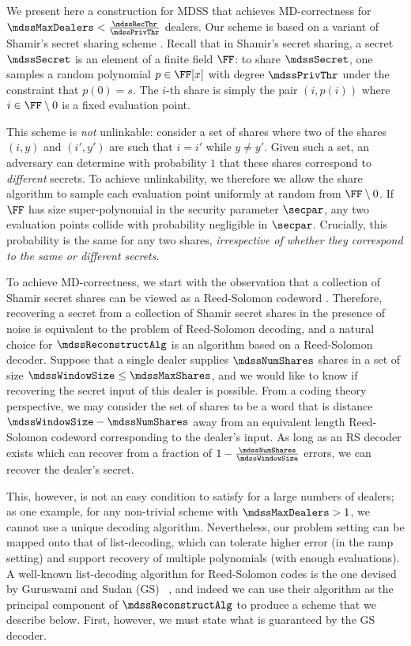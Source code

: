 We present here a construction for MDSS that achieves MD-correctness for $\mdssMaxDealers < \frac{\mdssRecThr}{\mdssPrivThr}$ dealers.
Our scheme is based on a variant of Shamir's secret sharing scheme \cite{Shamir79}.
Recall that in Shamir's secret sharing, a secret $\mdssSecret$ is an element of a finite field $\FF$: to share $\mdssSecret$, one samples a random polynomial $p \in \FF[x]$ with degree $\mdssPrivThr$ under the constraint that $p(0) = s$.
The $i$-th share is simply the pair $(i, p(i))$ where $i \in \FF \setminus 0$ is a fixed evaluation point.

This scheme is {\em not} unlinkable: consider a set of shares where two of the shares $(i,y)$ and $(i',y')$ are such that $i=i'$ while  $y\neq y'$.
Given such a set, an adversary can determine with probability $1$ that these shares correspond to {\em different} secrets.
To achieve unlinkability, we therefore we allow the share algorithm to sample each evaluation point uniformly at random from $\FF \setminus 0$.
If $\FF$ has size super-polynomial in the security parameter $\secpar$, any two evaluation points collide with probability negligible in $\secpar$.
Crucially, this probability is the same for any two shares, {\em irrespective of whether they correspond to the same or different secrets}.

To achieve MD-correctness, we start with the observation that a collection of Shamir secret shares can be viewed as a Reed-Solomon codeword \cite{localReeSol60, localMcEliece81}.
Therefore, recovering a secret from a collection of Shamir secret shares in the presence of noise is equivalent to the problem of Reed-Solomon decoding, and a natural choice for $\mdssReconstructAlg$ is an algorithm based on a Reed-Solomon decoder.
Suppose that a single dealer supplies $\mdssNumShares$ shares in a set of size $\mdssWindowSize \leq \mdssMaxShares$, and we would like to know if recovering the secret input of this dealer is possible.
From a coding theory perspective, we may consider the set of shares to be a word that is distance $\mdssWindowSize-\mdssNumShares$ away from an equivalent length Reed-Solomon codeword corresponding to the dealer's input.
As long as an RS decoder exists which can recover from a fraction of $1 - \frac{\mdssNumShares}{\mdssWindowSize}$ errors, we can recover the dealer's secret.

This, however, is not an easy condition to satisfy for a large numbers of dealers; as one example, for any non-trivial scheme with $\mdssMaxDealers > 1$, we cannot use a unique decoding algorithm.
Nevertheless, our problem setting can be mapped onto that of list-decoding, which can tolerate higher error (in the ramp setting) and support recovery of multiple polynomials (with enough evaluations).
A well-known list-decoding algorithm for Reed-Solomon codes is the one devised by Guruswami and Sudan (GS) ~\cite{FOCS:GurSud98}, and indeed we can use their algorithm as the principal component of $\mdssReconstructAlg$ to produce a scheme that we describe below.
First, however, we must state what is guaranteed by the GS decoder.

